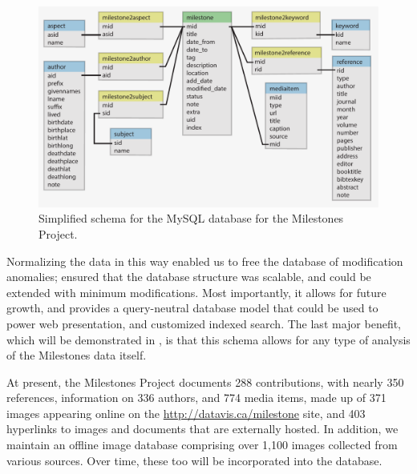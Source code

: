\begin{figure}[!htb]
  \centering
  \includegraphics[width=\textwidth,clip]{fig/datavis-schema-3}
  \caption{Simplified schema for the MySQL database for the Milestones Project.}
  \label{fig:datavis-schema-2}
\end{figure}

Normalizing the data in this way enabled us to free the database of 
modification anomalies; ensured that the database structure was scalable, and 
could be extended with minimum modifications. 
Most importantly, it allows for 
future growth, and provides a query-neutral database model \citep{Codd:1971} 
that could be used to power web presentation, and customized indexed search.
The last major benefit, which will be demonstrated in , is 
that this schema allows for any type of analysis of the Milestones data itself.

At present, the Milestones Project documents 288 contributions, with nearly 350 
references, information on 336 authors, and 774 media items, made up of 371 
images appearing online on the \url{http://datavis.ca/milestone} site, and 403 
hyperlinks to images and documents that are externally hosted. 
In addition, we 
maintain an offline image database comprising over 1,100 images collected from 
various sources. 
Over time, these too will be incorporated into the database.


